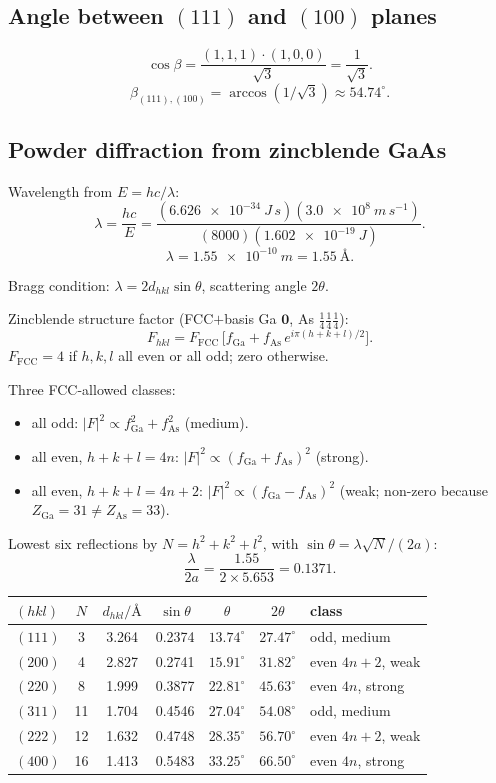 \documentclass[11pt]{article}
\begin{document}
\subsection*{Angle between $(111)$ and $(100)$ planes}

\[ \cos\beta = \frac{(1,1,1)\cdot(1,0,0)}{\sqrt 3} = \frac{1}{\sqrt 3}. \]
\[ \boxed{\;\beta_{(111),(100)} = \arccos(1/\sqrt 3) \approx 54.74^{\circ}.\;} \]

\subsection*{Powder diffraction from zincblende GaAs}

Wavelength from $E=hc/\lambda$:
\[ \lambda = \frac{hc}{E} = \frac{(\SI{6.626e-34}{J\,s})(\SI{3.0e8}{m\,s^{-1}})}{(8000)(\SI{1.602e-19}{J})}. \]
\[ \lambda = \SI{1.55e-10}{m} = \SI{1.55}{\angstrom}. \]

Bragg condition: $\lambda = 2d_{hkl}\sin\theta$, scattering angle $2\theta$.

Zincblende structure factor (FCC$+$basis Ga $\bm 0$, As $\tfrac14\tfrac14\tfrac14$):
\[ F_{hkl} = F_{\text{FCC}}\,\bigl[f_\text{Ga}+f_\text{As}\,e^{i\pi(h+k+l)/2}\bigr]. \]
$F_{\text{FCC}}=4$ if $h,k,l$ all even or all odd; zero otherwise.

Three FCC-allowed classes:
\begin{itemize}\setlength\itemsep{0pt}
\item all odd: $|F|^{2}\propto f_{\text{Ga}}^{2}+f_{\text{As}}^{2}$ (medium).
\item all even, $h+k+l=4n$: $|F|^{2}\propto (f_{\text{Ga}}+f_{\text{As}})^{2}$ (strong).
\item all even, $h+k+l=4n+2$: $|F|^{2}\propto (f_{\text{Ga}}-f_{\text{As}})^{2}$ (weak; non-zero because $Z_{\text{Ga}}=31\ne Z_{\text{As}}=33$).
\end{itemize}

Lowest six reflections by $N=h^{2}+k^{2}+l^{2}$, with $\sin\theta=\lambda\sqrt N/(2a)$:
\[ \frac{\lambda}{2a} = \frac{1.55}{2\times 5.653} = 0.1371. \]

\begin{center}
\begin{tabular}{lcccccl}
\toprule
$(hkl)$ & $N$ & $d_{hkl}/\si{\angstrom}$ & $\sin\theta$ & $\theta$ & $2\theta$ & class \\
\midrule
$(111)$ & 3  & 3.264 & 0.2374 & $13.74^\circ$ & $27.47^\circ$ & odd, medium \\
$(200)$ & 4  & 2.827 & 0.2741 & $15.91^\circ$ & $31.82^\circ$ & even $4n+2$, weak \\
$(220)$ & 8  & 1.999 & 0.3877 & $22.81^\circ$ & $45.63^\circ$ & even $4n$, strong \\
$(311)$ & 11 & 1.704 & 0.4546 & $27.04^\circ$ & $54.08^\circ$ & odd, medium \\
$(222)$ & 12 & 1.632 & 0.4748 & $28.35^\circ$ & $56.70^\circ$ & even $4n+2$, weak \\
$(400)$ & 16 & 1.413 & 0.5483 & $33.25^\circ$ & $66.50^\circ$ & even $4n$, strong \\
\bottomrule
\end{tabular}
\end{center}
\end{document}
